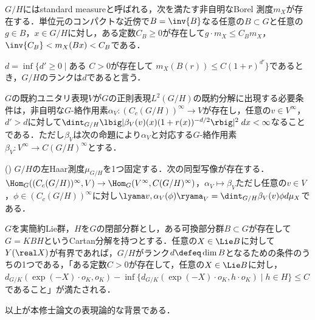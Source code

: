 $G/H$にはstandard measureと呼ばれる，次を満たす非自明なBorel 測度$m_X $が存在する．単位元のコンパクトな近傍で$B = \inv{B} $なる任意の$B\subset G$と任意の$g\in B$，$x\in G/H$に対し，ある定数$C_B\geq 0 $が存在して$g\cdot m_X \leq C_B m_X$，$ \inv{C_B} < m_X(Bx) < C_{B}$である．

$d = \inf\{d'\geq 0\mid \text{ある } C > 0\text{が存在して }  m_X(B(r))\leq C(1+r)^{d'}\} $であるとき，$G/H$のランクは$d$であると言う．

$G$の既約ユニタリ表現$V$が$G$の正則表現$L^2(G/H)$の既約分解に出現する必要条件は，非自明な$G$-絡作用素$\alpha_V\colon (C_c(G/H))^{\infty}\to V $が存在し，任意の$v\in V^{\infty} $，$d' > d$に対して$\dint_{G/H}\lbig|\beta_V(v)(x)(1+r(x))^{-d/2} \rbig|^2\; dx < \infty $なることである．ただし$\beta_V $は次の命題により$\alpha_V $と対応する$G$-絡作用素$\beta_V\colon V^{\infty}\to C(G/H)^{\infty}  $とする．
\begin{prop*}(\cite[p.~678]{ber88})
  $G/H$の左Haar測度$\mu_{G/H} $を1つ固定する．次の同型写像が存在する．$\Hom_{G}((C_c(G/H))^{\infty}, V )\to \Hom_{G}(V^{\infty}, C(G/H)^{\infty}) $，$\alpha_V\mapsto \beta_V$ただし任意の$v\in V$，$\phi \in  (C_c(G/H))^{\infty} $に対し$ \lyama v,\alpha_V(\phi)\ryama_{V} = \dint_{G/H}\beta_V(v)\phi d\mu_X  $である．
\end{prop*}

$G$を実簡約Lie群，$H$を$G$の閉部分群とし，ある可換部分群$B\subset G$が存在して$G = KBH $というCartan分解を持つとする．任意の$X\in \Lie B$に対して$Y(\real X) $が有界であれば，$G/H$がランク$d \defeq \dim B $となるための条件のうちの1つである，「ある定数$C > 0$が存在して，任意の$X\in \Lie B$に対し，$d_{G/K}(\exp(-X)\cdot o_K, o_K )  - \inf\{d_{G/K}(\exp(-X)\cdot o_K,h\cdot o_K ) \mid h\in H\}\leq C$であること」が満たされる．

以上が本修士論文の表現論的な背景である．
